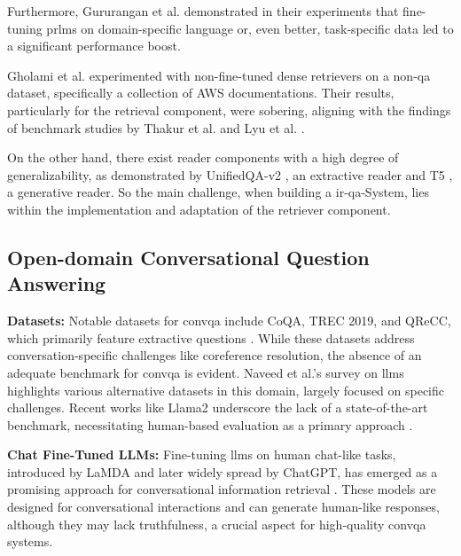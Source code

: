Furthermore, Gururangan et al. \cite{gururangan_dont_2020} demonstrated in their experiments that fine-tuning \glspl{prlm} on domain-specific language or, even better, task-specific data led to a significant performance boost.

Gholami et al. \cite{gholami_zero-shot_2021} experimented with non-fine-tuned dense retrievers on a non-\gls{qa} dataset, specifically a collection of AWS documentations. Their results, particularly for the retrieval component, were sobering, aligning with the findings of benchmark studies by Thakur et al. \cite{thakur_beir_2021} and Lyu et al. \cite{farea_evaluation_2022}.

On the other hand, there exist reader components with a high degree of generalizability, as demonstrated by UnifiedQA-v2 \cite{khashabi_unifiedqa-v2_2022}, an extractive reader and T5 \cite{raffel_exploring_2023}, a generative reader. So the main challenge, when building a \gls{ir}-\gls{qa}-System, lies within the implementation and adaptation of the retriever component.


\subsection{Open-domain Conversational Question Answering}
\label{subsec:related_work_cqa}

\textbf{Datasets:} Notable datasets for \gls{convqa} include CoQA, TREC 2019, and QReCC, which primarily feature extractive questions \cite{reddy_coqa_2018, dalton_trec_2020, dai_dialog_2022}. While these datasets address conversation-specific challenges like coreference resolution, the absence of an adequate benchmark for \gls{convqa} is evident. Naveed et al.'s survey on \gls{llm}s \cite{naveed_comprehensive_2023} highlights various alternative datasets in this domain, largely focused on specific challenges. Recent works like Llama2 underscore the lack of a state-of-the-art benchmark, necessitating human-based evaluation as a primary approach \cite{touvron_llama_2023}.

\vspace{\baselineskip}
\noindent\textbf{Chat Fine-Tuned LLMs:} Fine-tuning \gls{llm}s on human chat-like tasks, introduced by LaMDA and later widely spread by ChatGPT, has emerged as a promising approach for conversational information retrieval \cite{thoppilan_lamda_2022, noauthor_chatgpt_2023}. These models are designed for conversational interactions and can generate human-like responses, although they may lack truthfulness, a crucial aspect for high-quality \gls{convqa} systems.

